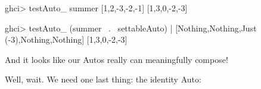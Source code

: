 \documentclass[]{article}
\newenvironment{Shaded}{}{}
\newcommand{\CommentTok}[1]{\textcolor[rgb]{0.38,0.63,0.69}{\textit{#1}}}
\newcommand{\DataTypeTok}[1]{\textcolor[rgb]{0.56,0.13,0.00}{#1}}
\newcommand{\DecValTok}[1]{\textcolor[rgb]{0.25,0.63,0.44}{#1}}
\newcommand{\FunctionTok}[1]{\textcolor[rgb]{0.02,0.16,0.49}{#1}}
\newcommand{\NormalTok}[1]{#1}
\newcommand{\OtherTok}[1]{\textcolor[rgb]{0.00,0.44,0.13}{#1}}
\begin{document}
\begin{Shaded}
\begin{Highlighting}[]
\NormalTok{ghci}\FunctionTok{>}\NormalTok{ testAuto_ summer [}\DecValTok{1}\NormalTok{,}\DecValTok{2}\NormalTok{,}\FunctionTok{-}\DecValTok{3}\NormalTok{,}\FunctionTok{-}\DecValTok{2}\NormalTok{,}\FunctionTok{-}\DecValTok{1}\NormalTok{]}
\NormalTok{[}\DecValTok{1}\NormalTok{,}\DecValTok{3}\NormalTok{,}\DecValTok{0}\NormalTok{,}\FunctionTok{-}\DecValTok{2}\NormalTok{,}\FunctionTok{-}\DecValTok{3}\NormalTok{]}

\NormalTok{ghci}\FunctionTok{>}\NormalTok{ testAuto_ (summer }\FunctionTok{~.~}\NormalTok{ settableAuto)}
    \FunctionTok{|}\NormalTok{     [}\DataTypeTok{Nothing}\NormalTok{,}\DataTypeTok{Nothing}\NormalTok{,}\DataTypeTok{Just}\NormalTok{ (}\FunctionTok{-}\DecValTok{3}\NormalTok{),}\DataTypeTok{Nothing}\NormalTok{,}\DataTypeTok{Nothing}\NormalTok{]}
\NormalTok{[}\DecValTok{1}\NormalTok{,}\DecValTok{3}\NormalTok{,}\DecValTok{0}\NormalTok{,}\FunctionTok{-}\DecValTok{2}\NormalTok{,}\FunctionTok{-}\DecValTok{3}\NormalTok{]}
\end{Highlighting}
\end{Shaded}

And it looks like our Autos really can meaningfully compose!

Well, wait. We need one last thing: the identity Auto:

\begin{Shaded}
\end{Shaded}
\end{document}
